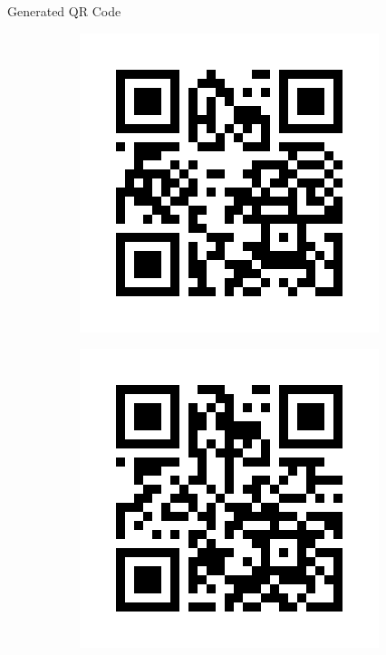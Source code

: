 \begin{frame}{Generated QR Code}
\begin{block}{}
    \begin{figure}[h!]
    \centering
    \begin{subfigure}[b]{0.45\textwidth}
        \centering
        \includegraphics[width=\textwidth]{message.png} %
        \label{fig:image1}
    \end{subfigure}
    \hfill
    \begin{subfigure}[b]{0.45\textwidth}
        \centering
        \includegraphics[width=\textwidth]{birth.png} %
        \label{fig:image2}
    \end{subfigure}


\end{figure}
\end{block}
\end{frame}
